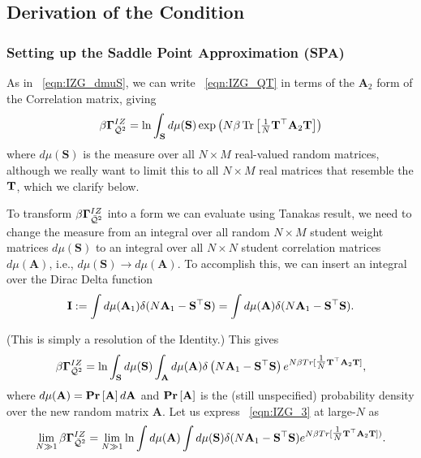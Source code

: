 \subsection{Derivation of the \TRACELOG Condition}
\label{sxn:TraceLogDerivation}


\subsubsection{Setting up the Saddle Point Approximation (SPA)}
\label{sxn:TraceLogDerivation_A}

As in \EQN~\ref{eqn:IZG_dmuS}, 
we can write \EQN~\ref{eqn:IZG_QT} in terms of the $\mathbf{A}_{2}$ form of the \Student Correlation matrix, 
giving
\begin{align}
\beta\mathbf{\Gamma}^{IZ}_{\bar{\mathcal{Q}}^{2}} = \ln\int_{{\mathbf{S}}}  d\mu(\mathbf{S}) \exp\left(N\beta \mbox{}\operatorname{Tr}\left[ \tfrac{1}{N}{\mathbf{T}}^{\top} \mathbf{A}_{2} {\mathbf{T}} \right] \right)
\end{align}
where $d\mu(\mathbf{S})$ is the measure over all $N \times M$ real-valued random matrices,
although we really want to limit this to all $N \times M$ real matrices that resemble the \Teacher ${\mathbf{T}}$,
which we clarify below.

To transform $\beta\mathbf{\Gamma}^{IZ}_{\bar{\mathcal{Q}}^{2}}$ into a form we can evaluate using Tanakas result, 
we need to change the measure from an integral over all random $N \times M$ student weight matrices
$d\mu(\mathbf{S})$ to an integral over all $N \times N$
student correlation matrices $d\mu(\mathbf{A})$, i.e., $d\mu(\mathbf{S})\rightarrow d\mu(\mathbf{A})$.
To accomplish this, we can insert an integral over the Dirac Delta function
\begin{align}
  \label{eqn:I}
  \mathbf{I}:=
  \int d\mu(\mathbf{A}_{1})\delta(N\mathbf{A}_{1}-\mathbf{S}^{\top}\mathbf{S}) =
    \int d\mu(\mathbf{A})\delta(N\mathbf{A}_{1}-\mathbf{S}^{\top}\mathbf{S}).
\end{align}

\noindent
(This is simply a resolution of the Identity.)
This gives
\begin{align}
\label{eqn:IZG_3}
\beta\mathbf{\Gamma}^{IZ}_{\bar{\mathcal{Q}}^{2}}= \ln \int_{{\mathbf{S}}} d\mu(\mathbf{S})\int_{\mathbf{A}} d\mu(\mathbf{A})
           \delta\left( N\mathbf{A}_{1}-\mathbf{S}^{\top}\mathbf{S} \right) 
           e^{ N\beta Tr[\tfrac{1}{N} {\mathbf{T}}^{\top} \mathbf{A}_{2}{\mathbf{T}} ] } ,
\end{align}
where $d\mu(\mathbf{A})=\mbox{}{\bf{Pr}}\left[\mathbf{A}\right]d\mathbf{A}$ and $\mbox{}{\bf{Pr}}\left[\mathbf{A}\right]$ is the
(still unspecified) probability density over the new random matrix $\mathbf{A}$. 
%
Let us express \EQN~\ref{eqn:IZG_3} at large-$N$ as
\begin{align}
  \label{eqn:IZG_4}
  \lim_{N\gg 1}\beta\mathbf{\Gamma}^{IZ}_{\bar{\mathcal{Q}}^{2}} =
  \lim_{N\gg 1}\ln
  \int d\mu(\mathbf{A})
  \int d\mu(\mathbf{S})
  \delta(N\mathbf{A}_{1}-\mathbf{S}^{\top}\mathbf{S})
  e^{ N\beta Tr[ \tfrac{1}{N}{\mathbf{T}}^{\top}\mathbf{A}_{2}{\mathbf{T}}]) }  .
\end{align}
 
